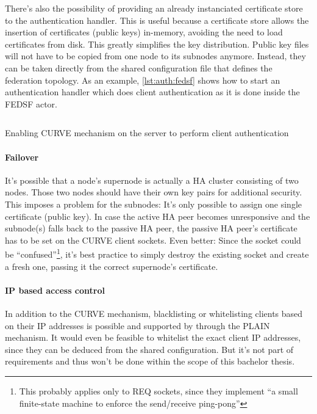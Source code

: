 There's also the possibility of providing an already instanciated certificate
store to the authentication handler. This is useful because a certificate store
allows the insertion of certificates (public keys) in-memory, avoiding the need
to load certificates from disk. This greatly simplifies the key distribution.
Public key files will not have to be copied from one node to its subnodes
anymore. Instead, they can be taken directly from the shared configuration file
that defines the federation topology. As an example, \autoref{lst:auth:fedsf}
shows how to start an authentication handler which does client authentication
as it is done inside the FEDSF actor.

\begin{listing}
	\inputminted[bgcolor=bg]{Ruby}{listings/auth/fedsf.rb}
	\caption{Enabling CURVE mechanism on the server to perform client authentication}
	\label{lst:auth:fedsf}
\end{listing}

\paragraph{Failover}\label{sec:approach:encryption:ha}
It's possible that a node's supernode is actually a HA cluster consisting of
two nodes. Those two nodes should have their own key pairs for additional
security. This imposes a problem for the subnodes: It's only possible to assign
one single certificate (public key). In case the active HA peer becomes
unresponsive and the subnode(s) falls back to the passive HA peer, the passive
HA peer's certificate has to be set on the CURVE client sockets. Even better:
Since the socket could be \cite[Binary Star Implementation, Binary Star client
in C]{zmq:zguide} ``confused''\footnote{This probably applies only to REQ
sockets, since they implement \cite[Client-Side Reliability (Lazy Pirate
Pattern)]{zmq:zguide} ``a small finite-state machine to enforce the
send/receive ping-pong''}, it's best practice to simply destroy the existing
socket and create a fresh one, passing it the correct supernode's certificate.

\paragraph{IP based access control}
In addition to the CURVE mechanism, blacklisting or whitelisting clients based
on their \gls{IP} addresses is possible and supported by
 through the PLAIN mechanism. It would even be
feasible to whitelist the exact client IP addresses, since they can be deduced
from the shared configuration. But it's not part of requirements and thus won't
be done within the scope of this bachelor thesis.

